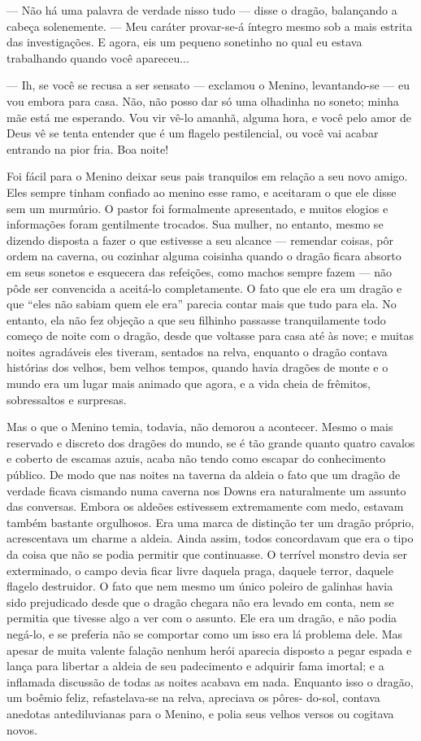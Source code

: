 — Não há uma palavra de verdade nisso tudo — disse o dragão,
balançando a cabeça solenemente. — Meu caráter provar-se-á íntegro
mesmo sob a mais estrita das investigações. E agora, eis um pequeno
sonetinho no qual eu estava trabalhando quando você apareceu...

— Ih, se você se recusa a ser sensato — exclamou o Menino,
levantando-se — eu vou embora para casa. Não, não posso dar só uma
olhadinha no soneto; minha mãe está me esperando. Vou vir vê-lo
amanhã, alguma hora, e você pelo amor de Deus vê se tenta entender
que é um flagelo pestilencial, ou você vai acabar entrando na pior
fria. Boa noite!

Foi fácil para o Menino deixar seus pais tranquilos em relação a seu
novo amigo. Eles sempre tinham confiado ao menino esse ramo, e
aceitaram o que ele disse sem um murmúrio. O pastor foi formalmente
apresentado, e muitos elogios e informações foram gentilmente
trocados. Sua mulher, no entanto, mesmo se dizendo disposta a fazer o
que estivesse a seu alcance — remendar coisas, pôr ordem na caverna,
ou cozinhar alguma coisinha quando o dragão ficara absorto em seus
sonetos e esquecera das refeições, como machos sempre fazem — não
pôde ser convencida a aceitá-lo completamente. O fato que ele era um
dragão e que “eles não sabiam quem ele era” parecia contar mais que
tudo para ela. No entanto, ela não fez objeção a que seu filhinho
passasse tranquilamente todo começo de noite com o dragão, desde que
voltasse para casa até às nove; e muitas noites agradáveis eles
tiveram, sentados na relva, enquanto o dragão contava histórias dos
velhos, bem velhos tempos, quando havia dragões de monte e o mundo
era um lugar mais animado que agora, e a vida cheia de frêmitos,
sobressaltos e surpresas.

Mas o que o Menino temia, todavia, não demorou a acontecer. Mesmo o
mais reservado e discreto dos dragões do mundo, se é tão grande
quanto quatro cavalos e coberto de escamas azuis, acaba não tendo
como escapar do conhecimento público. De modo que nas noites na
taverna da aldeia o fato que um dragão de verdade ficava cismando
numa caverna nos Downs era naturalmente um assunto das conversas.
Embora os aldeões estivessem extremamente com medo, estavam também
bastante orgulhosos. Era uma marca de distinção ter um dragão
próprio, acrescentava um charme a aldeia. Ainda assim, todos
concordavam que era o tipo da coisa que não se podia permitir que
continuasse. O terrível monstro devia ser exterminado, o campo devia
ficar livre daquela praga, daquele terror, daquele flagelo
destruidor. O fato que nem mesmo um único poleiro de galinhas havia
sido prejudicado desde que o dragão chegara não era levado em conta,
nem se permitia que tivesse algo a ver com o assunto. Ele era um
dragão, e não podia negá-lo, e se preferia não se comportar como um
isso era lá problema dele. Mas apesar de muita valente falação nenhum
herói aparecia disposto a pegar espada e lança para libertar a aldeia
de seu padecimento e adquirir fama imortal; e a inflamada discussão
de todas as noites acabava em nada. Enquanto isso o dragão, um boêmio
feliz, refastelava-se na relva, apreciava os pôres- do-sol, contava
anedotas antediluvianas para o Menino, e polia seus velhos versos ou
cogitava novos.

